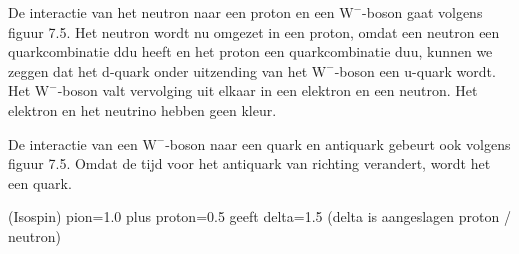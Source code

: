 De interactie van het neutron naar een proton en een $\mathrm{W}^{-}$-boson
gaat volgens figuur 7.5. Het neutron wordt nu omgezet in een proton,
omdat een neutron een quarkcombinatie ddu heeft en het proton een
quarkcombinatie duu, kunnen we zeggen dat het d-quark onder uitzending
van het $\mathrm{W}^{-}$-boson een u-quark wordt. Het $\mathrm{W}^{-}$-boson
valt vervolging uit elkaar in een elektron en een neutron. Het elektron
en het neutrino hebben geen kleur.

De interactie van een $\mathrm{W}^{-}$-boson naar een quark en antiquark
gebeurt ook volgens figuur 7.5. Omdat de tijd voor het antiquark van
richting verandert, wordt het een quark. 

(Isospin) pion=1.0 plus proton=0.5 geeft delta=1.5 (delta is aangeslagen
proton / neutron)


